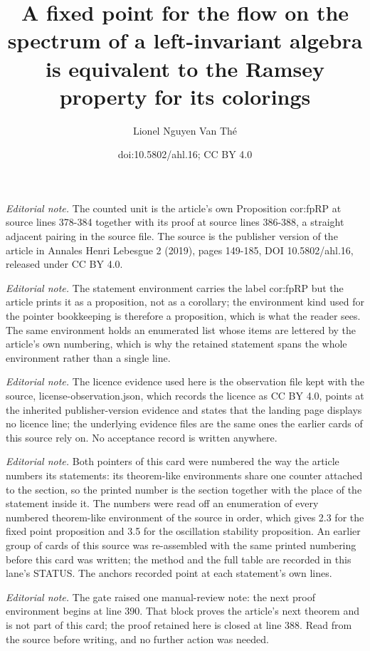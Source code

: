 \documentclass[10pt,a4paper]{article}
\title{A fixed point for the flow on the spectrum of a left-invariant algebra is equivalent to the Ramsey property for its colorings}
\author{Lionel Nguyen Van Thé}
\date{doi:10.5802/ahl.16; CC BY 4.0}
\theoremstyle{definition}
\numberwithin{equation}{section}
\numberwithin{figure}{section}
\numberwithin{table}{section}
\begin{document}
\maketitle
\noindent\textit{Editorial note.} The counted unit is the article's own Proposition cor:fpRP at source lines 378-384 together with its proof at source lines 386-388, a straight adjacent pairing in the source file. The source is the publisher version of the article in Annales Henri Lebesgue 2 (2019), pages 149-185, DOI 10.5802/ahl.16, released under CC BY 4.0.\par\medskip
\noindent\textit{Editorial note.} The statement environment carries the label cor:fpRP but the article prints it as a proposition, not as a corollary; the environment kind used for the pointer bookkeeping is therefore a proposition, which is what the reader sees. The same environment holds an enumerated list whose items are lettered by the article's own numbering, which is why the retained statement spans the whole environment rather than a single line.\par\medskip
\noindent\textit{Editorial note.} The licence evidence used here is the observation file kept with the source, license-observation.json, which records the licence as CC BY 4.0, points at the inherited publisher-version evidence and states that the landing page displays no licence line; the underlying evidence files are the same ones the earlier cards of this source rely on. No acceptance record is written anywhere.\par\medskip
\noindent\textit{Editorial note.} Both pointers of this card were numbered the way the article numbers its statements: its theorem-like environments share one counter attached to the section, so the printed number is the section together with the place of the statement inside it. The numbers were read off an enumeration of every numbered theorem-like environment of the source in order, which gives 2.3 for the fixed point proposition and 3.5 for the oscillation stability proposition. An earlier group of cards of this source was re-assembled with the same printed numbering before this card was written; the method and the full table are recorded in this lane's STATUS. The anchors recorded point at each statement's own lines.\par\medskip
\noindent\textit{Editorial note.} The gate raised one manual-review note: the next proof environment begins at line 390. That block proves the article's next theorem and is not part of this card; the proof retained here is closed at line 388. Read from the source before writing, and no further action was needed.\par\medskip
\end{document}
